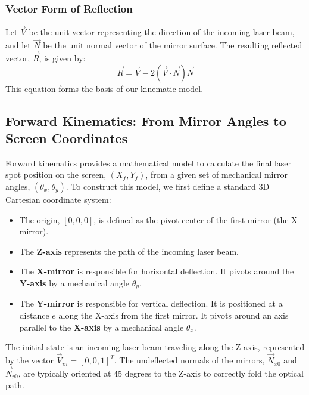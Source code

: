 \documentclass[12pt]{article}
\begin{document}
\subsubsection{Vector Form of Reflection}
Let \(\vec{V}\) be the unit vector representing the direction of the incoming laser beam, and let \(\vec{N}\) be the unit normal vector of the mirror surface. The resulting reflected vector, \(\vec{R}\), is given by:
\begin{equation}
    \vec{R} = \vec{V} - 2(\vec{V} \cdot \vec{N})\vec{N}
    \label{eq:vector_reflection}
\end{equation}
This equation forms the basis of our kinematic model. 

\subsection{Forward Kinematics: From Mirror Angles to Screen Coordinates}

Forward kinematics provides a mathematical model to calculate the final laser spot position on the screen, \((X_f, Y_f)\), from a given set of mechanical mirror angles, \((\theta_x, \theta_y)\). To construct this model, we first define a standard 3D Cartesian coordinate system:

\begin{itemize}
\item The origin, \([0,0,0]\), is defined as the pivot center of the first mirror (the X-mirror).
\item The \textbf{Z-axis} represents the path of the incoming laser beam.
\item The \textbf{X-mirror} is responsible for horizontal deflection. It pivots around the \textbf{Y-axis} by a mechanical angle \(\theta_y\).
\item The \textbf{Y-mirror} is responsible for vertical deflection. It is positioned at a distance \(e\) along the X-axis from the first mirror. It pivots around an axis parallel to the \textbf{X-axis} by a mechanical angle \(\theta_x\).
\end{itemize}

The initial state is an incoming laser beam traveling along the Z-axis, represented by the vector \(\vec{V}_{in} = [0, 0, 1]^T\). The undeflected normals of the mirrors, \(\vec{N}_{x0}\) and \(\vec{N}_{y0}\), are typically oriented at 45 degrees to the Z-axis to correctly fold the optical path.
\end{document}
